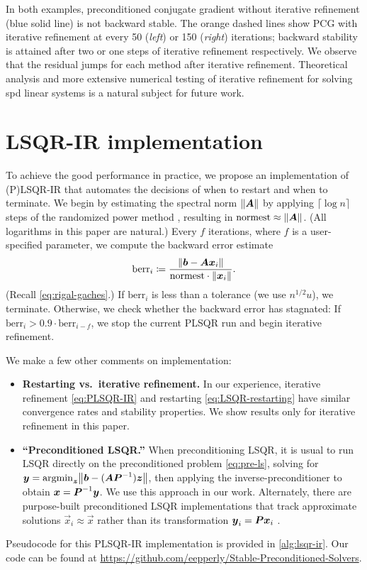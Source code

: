 \documentclass[onefignum,onetabnum,pagebackref,dvipsnames]{siamart220329}
\begin{document}
In both examples, preconditioned conjugate gradient without iterative refinement (blue solid line) is not backward stable.
The orange dashed lines show PCG with iterative refinement at every 50 (\emph{left}) or 150 (\emph{right}) iterations; backward stability is attained after two or one steps of iterative refinement respectively.
We observe that the residual jumps for each method after iterative refinement.
Theoretical analysis and more extensive numerical testing of iterative refinement for solving spd linear systems is a natural subject for future work.

\section{LSQR-IR implementation} \label{sec:impl-exp}

To achieve the good performance in practice, we propose an implementation of (P)LSQR-IR that automates the decisions of when to restart and when to terminate.
We begin by estimating the spectral norm $\norm{\mat{A}}$ by applying $\lceil \log n\rceil$ steps of the randomized power method \cite[sec.~6.2]{MT20b}, resulting in $\mathrm{normest} \approx \norm{\mat{A}}$. (All logarithms in this paper are natural.)
Every $f$ iterations, where $f$ is a user-specified parameter, we compute the backward error estimate
%
\begin{equation*}
    \mathrm{berr}_i \coloneqq \frac{\norm{\vec{b} - \mat{A}\vec{x}_i}}{\mathrm{normest} \cdot \norm{\vec{x}_i}}.
\end{equation*}
%
(Recall \cref{eq:rigal-gaches}.)
If $\mathrm{berr}_i$ is less than a tolerance (we use $n^{1/2}u$), we terminate.
Otherwise, we check whether the backward error has stagnated: If $\mathrm{berr}_i > 0.9 \cdot \mathrm{berr}_{i-f}$, we stop the current PLSQR run and begin iterative refinement.

We make a few other comments on implementation:
%
\begin{itemize}
    \item \textbf{Restarting vs.\ iterative refinement.} In our experience, iterative refinement \cref{eq:PLSQR-IR} and restarting \cref{eq:LSQR-restarting} have similar convergence rates and stability properties.
    We show results only for iterative refinement in this paper.
    \item \textbf{``Preconditioned LSQR.''}
    When preconditioning LSQR, it is usual to run LSQR directly on the preconditioned problem \cref{eq:pre-ls}, solving for $\vec{y} = \argmin_{\vec{z}} \norm{\vec{b} - (\mat{A}\mat{P}^{-1})\vec{z}}$, then applying the inverse-preconditioner to obtain $\boldsymbol{x} = \boldsymbol{P}^{-1}\boldsymbol{y}$.
    We use this approach in our work.
    Alternately, there are purpose-built preconditioned LSQR implementations that track approximate solutions $\vec{x}_i\approx \vec{x}$ rather than its transformation $\boldsymbol{y}_i = \boldsymbol{P}\boldsymbol{x}_i$ \cite[sec.~4.5]{Mei24}.
\end{itemize}
%
Pseudocode for this PLSQR-IR implementation is provided in \cref{alg:lsqr-ir}.
Our code can be found at \url{https://github.com/eepperly/Stable-Preconditioned-Solvers}.
\end{document}
